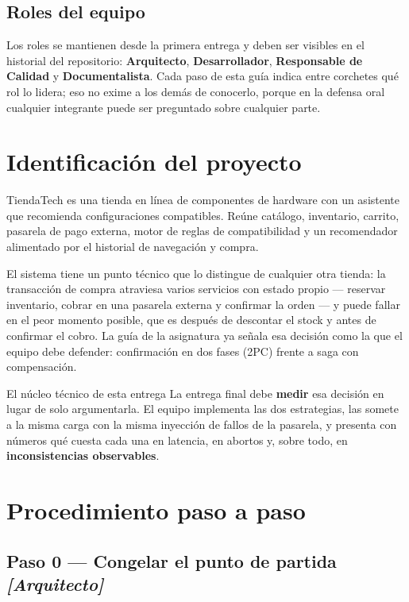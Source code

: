 \documentclass[11pt,a4paper]{article}
\newcommand{\paso}[1]{\subsection{#1}}
\begin{document}
	\subsection{Roles del equipo}
	
	Los roles se mantienen desde la primera entrega y deben ser visibles en el historial del repositorio: \textbf{Arquitecto}, \textbf{Desarrollador}, \textbf{Responsable de Calidad} y \textbf{Documentalista}. Cada paso de esta guía indica entre corchetes qué rol lo lidera; eso no exime a los demás de conocerlo, porque en la defensa oral cualquier integrante puede ser preguntado sobre cualquier parte.
	
	\section{Identificación del proyecto}
	
	TiendaTech es una tienda en línea de componentes de hardware con un asistente que recomienda configuraciones compatibles. Reúne catálogo, inventario, carrito, pasarela de pago externa, motor de reglas de compatibilidad y un recomendador alimentado por el historial de navegación y compra.
	
	El sistema tiene un punto técnico que lo distingue de cualquier otra tienda: la transacción de compra atraviesa varios servicios con estado propio --- reservar inventario, cobrar en una pasarela externa y confirmar la orden --- y puede fallar en el peor momento posible, que es después de descontar el stock y antes de confirmar el cobro. La guía de la asignatura ya señala esa decisión como la que el equipo debe defender: confirmación en dos fases (2PC) frente a saga con compensación.
	
	\begin{defBox}{El núcleo técnico de esta entrega}
		La entrega final debe \textbf{medir} esa decisión en lugar de solo argumentarla. El equipo implementa las dos estrategias, las somete a la misma carga con la misma inyección de fallos de la pasarela, y presenta con números qué cuesta cada una en latencia, en abortos y, sobre todo, en \textbf{inconsistencias observables}.
	\end{defBox}
	
	\section{Procedimiento paso a paso}
	
	\paso{Paso 0 --- Congelar el punto de partida \emph{[Arquitecto]}}
	
\end{document}

